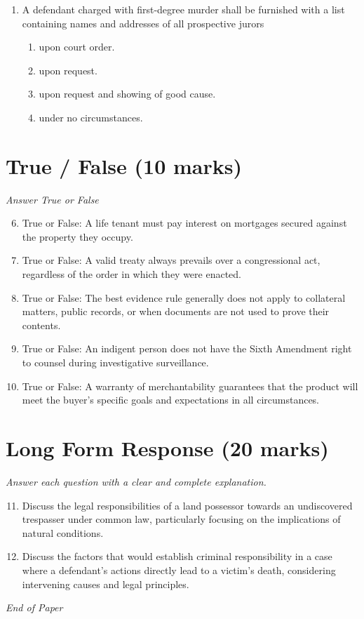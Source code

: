 \documentclass[12pt]{article}
\begin{document}
\begin{enumerate}[label=\arabic*.]
\begin{enumerate}[label=(\alph*)]
    \item Is valid for three months.
    \item Is nonassignable.
    \item Can not exceed a three-month duration even if consideration is given.
\end{enumerate}
\item A defendant charged with first-degree murder shall be furnished with a list containing names and addresses of all prospective jurors
\begin{enumerate}[label=(\alph*)]
    \item upon court order.
    \item upon request.
    \item upon request and showing of good cause.
    \item under no circumstances.
\end{enumerate}
\end{enumerate}

\section*{True / False (10 marks)}
\textit{Answer True or False}
\begin{enumerate}[label=\arabic*.]
\setcounter{enumi}{5}
\item True or False: A life tenant must pay interest on mortgages secured against the property they occupy.
\item True or False: A valid treaty always prevails over a congressional act, regardless of the order in which they were enacted.
\item True or False: The best evidence rule generally does not apply to collateral matters, public records, or when documents are not used to prove their contents.
\item True or False: An indigent person does not have the Sixth Amendment right to counsel during investigative surveillance.
\item True or False: A warranty of merchantability guarantees that the product will meet the buyer's specific goals and expectations in all circumstances.
\end{enumerate}

\section*{Long Form Response (20 marks)}
\textit{Answer each question with a clear and complete explanation.}
\begin{enumerate}[label=\arabic*.]
\setcounter{enumi}{10}
\item Discuss the legal responsibilities of a land possessor towards an undiscovered trespasser under common law, particularly focusing on the implications of natural conditions.
\item Discuss the factors that would establish criminal responsibility in a case where a defendant's actions directly lead to a victim's death, considering intervening causes and legal principles.
\end{enumerate}

\vfill
\noindent\textit{End of Paper}
\end{document}
